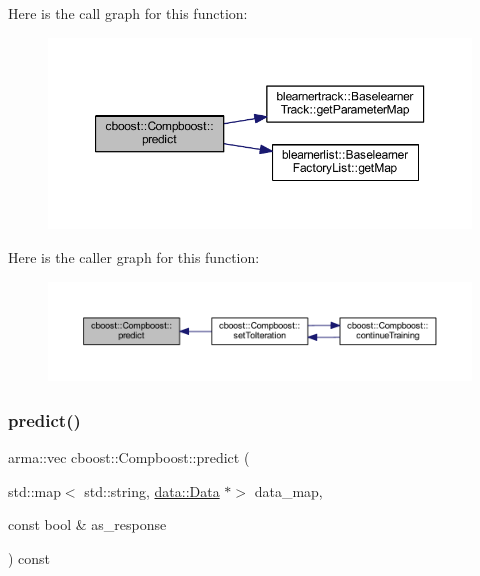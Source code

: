 Here is the call graph for this function\+:
\nopagebreak
\begin{figure}[H]
\begin{center}
\leavevmode
\includegraphics[width=350pt]{classcboost_1_1_compboost_a32d1066a24607ff6ef2f934002adf62b_cgraph}
\end{center}
\end{figure}
Here is the caller graph for this function\+:
\nopagebreak
\begin{figure}[H]
\begin{center}
\leavevmode
\includegraphics[width=350pt]{classcboost_1_1_compboost_a32d1066a24607ff6ef2f934002adf62b_icgraph}
\end{center}
\end{figure}
\mbox{\label{classcboost_1_1_compboost_a51c59cdddec77c2bed757aadad6afe1d}} 
\subsubsection{\texorpdfstring{predict()}{predict()}\hspace{0.1cm}{\footnotesize\ttfamily [2/2]}}
{\footnotesize\ttfamily arma\+::vec cboost\+::\+Compboost\+::predict (\begin{DoxyParamCaption}\item[{std\+::map$<$ std\+::string, \mbox{\hyperlink{classdata_1_1_data}{data\+::\+Data}} $\ast$$>$}]{data\+\_\+map,  }\item[{const bool \&}]{as\+\_\+response }\end{DoxyParamCaption}) const}

